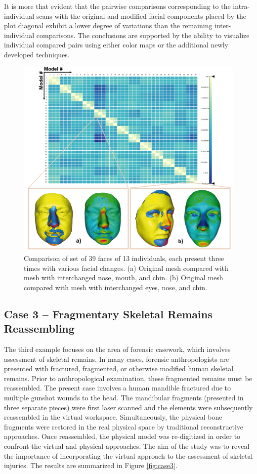 \documentclass[final,5p,times]{elsarticle}
\begin{document}
It is more that evident that the pairwise comparisons corresponding to the intra-individual scans with the original and modified facial components placed by the plot diagonal exhibit a lower degree of variations than the remaining inter-individual comparisons.
The conclusions are supported by the ability to visualize individual compared pairs using either color maps or the additional newly developed techniques. 

\begin{figure}[htb]
	\centering
  \includegraphics[width=0.9\linewidth]{pictures/case2.png}
  \caption{\label{fig:case2}Comparison of set of 39 faces of 13 individuals, each present three times with various facial changes. (a) Original mesh compared with mesh with interchanged nose, mouth, and chin. (b) Original mesh compared with mesh with interchanged eyes, nose, and chin.}
\end{figure}

\subsection{Case 3 -- Fragmentary Skeletal Remains Reassembling}
The third example focuses on the area of forensic casework, which involves assessment of skeletal remains. 
In many cases, forensic anthropologists are presented with fractured, fragmented, or otherwise modified human skeletal remains. 
Prior to anthropological examination, these fragmented remains must be reassembled. 
The present case involves a human mandible fractured due to multiple gunshot wounds to the head. 
The mandibular fragments (presented in three separate pieces) were first laser scanned and the elements were subsequently reassembled in the virtual workspace.
Simultaneously, the physical bone fragments were restored in the real physical space by traditional reconstructive approaches.
Once reassembled, the physical model was re-digitized in order to confront the virtual and physical approaches. 
The aim of the study was to reveal the importance of incorporating the virtual approach to the assessment of skeletal injuries. 
The results are summarized in Figure \ref{fig:case3}.
\end{document}

